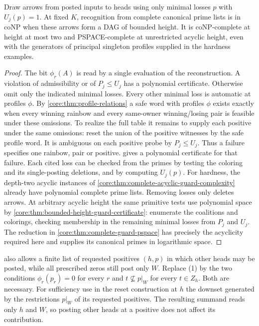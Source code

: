 \begin{corollary}
\label{core:cor:profile-residual-height}
Draw arrows from posted inputs to heads using only
minimal losses $p$ with $U_j(p)=1$. At fixed $K$, recognition from
complete canonical prime lists is in coNP when these arrows form a DAG
of bounded height. It is coNP-complete at height at most two and
PSPACE-complete at unrestricted acyclic height, even with the generators
of principal singleton profiles supplied in the hardness examples.
\end{corollary}
\begin{proof}
The bit $\phi_r(A)$ is read by a single evaluation of the reconstruction.
A violation of admissibility or of $P_j\le U_j$ has a polynomial
certificate. Otherwise omit only the indicated minimal losses.
Every other minimal loss is automatic at profiles $\phi$. By
\cref{core:thm:profile-relations} a safe word with profiles $\phi$
exists exactly when every winning rainbow and every same-owner
winning/losing pair is feasible under these omissions. To realize the
full table it remains to supply each positive under the same omissions:
reset the union of the positive witnesses by the safe profile word.
It is ambiguous on each positive probe by $P_j\le U_j$.
Thus a failure specifies one rainbow, pair or positive.
 gives a polynomial
certificate for that failure. Each cited loss can be checked from
the primes by testing the coloring and its single-posting deletions,
and by computing $U_j(p)$. For hardness, the depth-two acyclic
instances of \cref{core:thm:complete-acyclic-guard-complexity}
already have polynomial complete prime lists. Removing losses only
deletes arrows. At arbitrary acyclic height the same primitive tests
use polynomial space by \cref{core:thm:bounded-height-guard-certificate}:
enumerate the coalitions and colorings, checking membership in the
remaining minimal losses from $P_j$ and $U_j$. The reduction in
\cref{core:thm:complete-guard-pspace} has precisely the acyclicity
required here and supplies its canonical primes in logarithmic space.
\end{proof}

 also allows a finite list of requested positives $(h,p)$ in
which other heads may be posted, while all prescribed zeros still
post only $W$. Replace (1) by the two conditions
$\phi_r(p_r)=0$ for every $r$ and
$t\nsubseteq p|_W$ for every $t\in Z_h$. Both are necessary.
For sufficiency use in the reset construction at $h$ the downset
generated by the restrictions $p|_W$ of its requested positives.
The resulting summand reads only $h$ and $W$, so posting other heads
at a positive does not affect its contribution.


